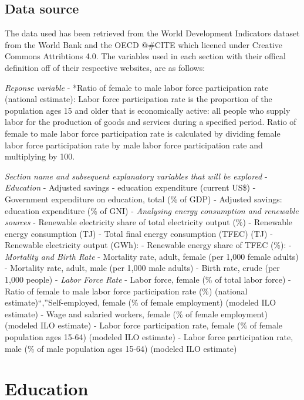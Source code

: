 \documentclass[11pt,a4paper,]{article}
\begin{document}
\hypertarget{data-source}{%
\subsection{Data source}\label{data-source}}

The data used has been retrieved from the World Development Indicators dataset from the World Bank \textcite{TheWorldBank2018} and the OECD @\#CITE which licened under Creative Commons Attribtions 4.0. The variables used in each section with their offical definition off of their respective websites, are as follows:

\emph{Reponse variable}
- *Ratio of female to male labor force participation rate (national estimate): Labor force participation rate is the proportion of the population ages 15 and older that is economically active: all people who supply labor for the production of goods and services during a specified period. Ratio of female to male labor force participation rate is calculated by dividing female labor force participation rate by male labor force participation rate and multiplying by 100.

\emph{Section name and subsequent explanatory variables that will be explored}
- \emph{Education}
- Adjusted savings - education expenditure (current US\$)
- Government expenditure on education, total (\% of GDP)
- Adjusted savings: education expenditure (\% of GNI)
- \emph{Analysing energy consumption and renewable sources}
- Renewable electricity share of total electricity output (\%)
- Renewable energy consumption (TJ)
- Total final energy consumption (TFEC) (TJ)
- Renewable electricity output (GWh):
- Renewable energy share of TFEC (\%):
- \emph{Mortality and Birth Rate}
- Mortality rate, adult, female (per 1,000 female adults)
- Mortality rate, adult, male (per 1,000 male adults)
- Birth rate, crude (per 1,000 people)
- \emph{Labor Force Rate}
- Labor force, female (\% of total labor force)
- Ratio of female to male labor force participation rate (\%) (national estimate)``,''Self-employed, female (\% of female employment) (modeled ILO estimate)
- Wage and salaried workers, female (\% of female employment) (modeled ILO estimate)
- Labor force participation rate, female (\% of female population ages 15-64) (modeled ILO estimate)
- Labor force participation rate, male (\% of male population ages 15-64) (modeled ILO estimate)

\section*{Education}
\end{document}

